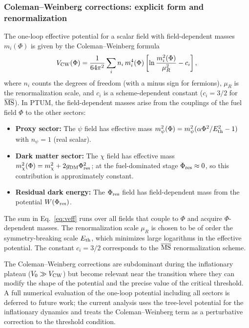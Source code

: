 \documentclass[epj]{svjour}
\begin{document}
\subsubsection{Coleman--Weinberg corrections: explicit form and renormalization}
\label{sec:coleman_weinberg}

The one-loop effective potential for a scalar field with field-dependent
masses $m_i(\Phi)$ is given by the Coleman--Weinberg formula
\begin{equation}
V_{\rm CW}(\Phi) = \frac{1}{64\pi^2}
\sum_i n_i\,m_i^4(\Phi)
\left[\ln\frac{m_i^2(\Phi)}{\mu_R^2} - c_i\right],
\end{equation}
where $n_i$ counts the degrees of freedom (with a minus sign for
fermions), $\mu_R$ is the renormalization scale, and $c_i$ is a
scheme-dependent constant ($c_i = 3/2$ for $\overline{\rm MS}$). In
PTUM, the field-dependent masses arise from the couplings of the fuel
field $\Phi$ to the other sectors:

\begin{itemize}
\item \textbf{Proxy sector:} The $\psi$ field has effective mass
      $m_\psi^2(\Phi) = m_\psi^2(\alpha\Phi^2/E_{\rm th}^2 - 1)$ with
      $n_\psi = 1$ (real scalar).
\item \textbf{Dark matter sector:} The $\chi$ field has effective mass
      $m_\chi^2(\Phi) = m_\chi^2 + 2g_{\rm DM}\Phi_{\rm res}^2$; at the
      fuel-dominated stage $\Phi_{\rm res} \approx 0$, so this
      contribution is approximately constant.
\item \textbf{Residual dark energy:} The $\Phi_{\rm res}$ field has
      field-dependent mass from the potential $W(\Phi_{\rm res})$.
\end{itemize}

The sum in Eq.~\eqref{eq:veff} runs over all fields that couple to
$\Phi$ and acquire $\Phi$-dependent masses. The renormalization scale
$\mu_R$ is chosen to be of order the symmetry-breaking scale
$E_{\rm th}$, which minimizes large logarithms in the effective
potential. The constant $c_i = 3/2$ corresponds to the
$\overline{\rm MS}$ renormalization scheme.

The Coleman--Weinberg corrections are subdominant during the
inflationary plateau ($V_0 \gg V_{\rm CW}$) but become relevant near
the transition where they can modify the shape of the potential and
the precise value of the critical threshold. A full numerical
evaluation of the one-loop potential including all sectors is
deferred to future work; the current analysis uses the tree-level
potential for the inflationary dynamics and treats the
Coleman--Weinberg term as a perturbative correction to the threshold
condition.
\end{document}

